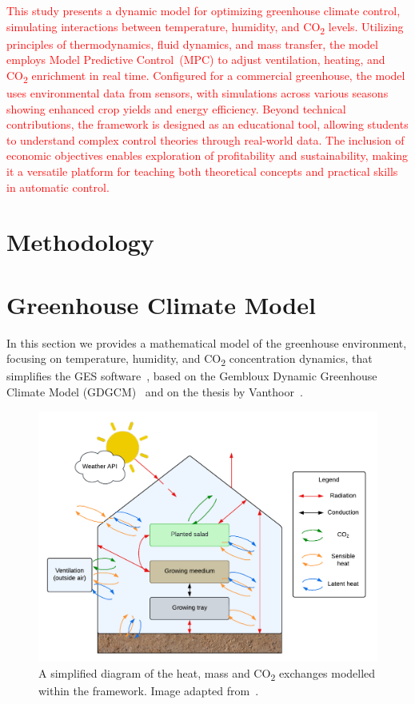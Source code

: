 \documentclass[conference]{IEEEtran}
\begin{document}
\textcolor{red}{This study presents a dynamic model for optimizing greenhouse climate control, simulating interactions between temperature, humidity, and CO\textsubscript{2} levels. Utilizing principles of thermodynamics, fluid dynamics, and mass transfer, the model employs Model Predictive Control~(MPC) to adjust ventilation, heating, and CO\textsubscript{2} enrichment in real time. Configured for a commercial greenhouse, the model uses environmental data from sensors, with simulations across various seasons showing enhanced crop yields and energy efficiency. Beyond technical contributions, the framework is designed as an educational tool, allowing students to understand complex control theories through real-world data. The inclusion of economic objectives enables exploration of profitability and sustainability, making it a versatile platform for teaching both theoretical concepts and practical skills in automatic control.}


\section{Methodology}\label{sec:methodology}

\section{Greenhouse Climate Model}\label{sec:greenhouse}

In this section we provides a mathematical model of the greenhouse environment, focusing on temperature, humidity, and CO\textsubscript{2} concentration dynamics, that simplifies the GES software~\cite{rmward61_2019}, based on the Gembloux Dynamic Greenhouse Climate Model (GDGCM)~\cite{GDGCM} and on the thesis by Vanthoor~\cite{Vanthoor2011}.

\begin{figure}
    \centering
    \includegraphics[width=.5\textwidth]{images/diagram.pdf}
    \caption{A simplified diagram of the heat, mass and CO\textsubscript{2} exchanges modelled within the framework. Image adapted from~\cite{rmward61_2019}.}\label{fig:diagram}
\end{figure}
\end{document}
